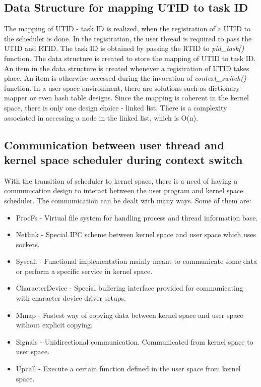 \documentclass[12pt]{article}
\begin{document}
\subsection*{Data Structure for mapping UTID to task ID}

The mapping of UTID - task ID is realized, when the registration of a UTID to the scheduler is done. 
In the registration, the user thread is required to pass the UTID and RTID. 
The task ID is obtained by passing the RTID to \emph{pid\_task()} function. 
The data structure is created to store the mapping of UTID to task ID. 
An item in the data structure is created whenever a registration of UTID takes place. 
An item is otherwise accessed during the invocation of \emph{context\_switch()} function. 
In a user space environment, there are solutions such as dictionary mapper or even hash table designs. 
Since the mapping is coherent in the kernel space, there is only one design choice - linked list. 
There is a complexity associated in accessing a node in the linked list, which is O(n).

\subsection*{Communication between user thread and kernel space scheduler during context switch} 

With the transition of scheduler to kernel space, there is a need of having a communication design to interact between the user program and kernel space scheduler. 
The communication can be dealt with many ways. 
Some of them are:

\begin{itemize}
\item ProcFs - Virtual file system for handling process and thread information base.
\item Netlink - Special IPC scheme between kernel space and user space which uses sockets.
\item Syscall - Functional implementation mainly meant to communicate some data or perform a specific service in kernel space. 
\item CharacterDevice - Special buffering interface provided for communicating with character device driver setups.
\item Mmap - Fastest way of copying data between kernel space and user space without explicit copying.
\item Signals - Unidirectional communication. Communicated from kernel space to user space. 
\item Upcall - Execute a certain function defined in the user space from kernel space.

\end{itemize}
\end{document}

